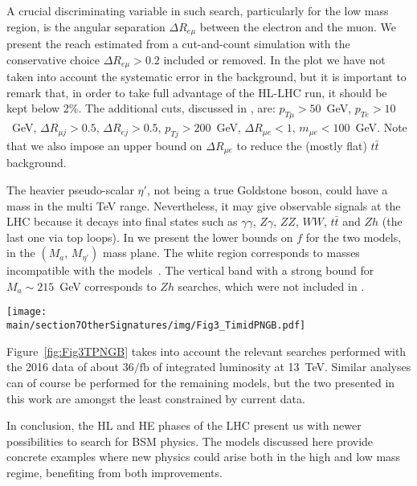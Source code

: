 A crucial discriminating variable in such search, particularly for the low mass region, is the angular separation $\Delta R_{e\mu}$ between the electron and the muon. We present the reach estimated from a cut-and-count simulation with the conservative choice $\Delta R_{e\mu}>0.2$ included or removed. In the plot we have not taken into account the systematic error in the background, but it is important to remark that, in order to take full advantage of the HL-LHC run, it should be kept below 2\%. The additional cuts, discussed in , are: $p_{T\mu}>50$~GeV, $p_{Te}>10$~GeV, $\Delta R_{\mu j}>0.5$, $\Delta R_{e j}>0.5$, $p_{Tj}>200$~GeV,  $\Delta R_{\mu e}<1$,  $m_{\mu e}<100$~GeV. Note that we also impose an upper bound on $\Delta R_{\mu e}$ to reduce the (mostly flat) $t \bar t$ background.

The heavier pseudo-scalar $\eta'$, not being a true Goldstone boson, could have a mass in the multi TeV range. Nevertheless, it may give observable signals at the LHC because it decays into final states such as $\gamma \gamma$, $Z\gamma$, $ZZ$, $WW$, $t\bar{t}$ and $Z h$ (the last one via top loops). In  we present the lower bounds on $f$ for the two models, in the $(M_a,\, M_{\eta'})$ mass plane. The white region corresponds to masses incompatible with the models~\cite{Belyaev:2016ftv}. 
The vertical band with a strong bound for $M_a \sim 215$~GeV corresponds to $Zh$ searches, which were not included in . 

\begin{figure*}[t] 
\begin{center}
\texttt{[image: \\main/section7OtherSignatures/img/Fig3\_TimidPNGB.pdf]} 
\end{center}
\caption{\label{fig:Fig3TPNGB} Lower bound the Higgs decay constant $f$ for the two benchmark models M6 and M8 in the presence of both pseudo-scalars $a$ and $\eta'$.}
\end{figure*}


Figure~\ref{fig:Fig3TPNGB} takes into account the relevant searches performed with the 2016 data of about $36/\mbox{fb}$ of integrated luminosity at 13~TeV.
Similar analyses can of course be performed for the remaining models, but the two presented in this work are amongst the least constrained by current data.

In conclusion, the HL and HE phases of the LHC present us with newer possibilities to search for BSM physics. The models discussed here provide concrete examples where new physics could arise both in the high and low mass regime, benefiting from both improvements.

